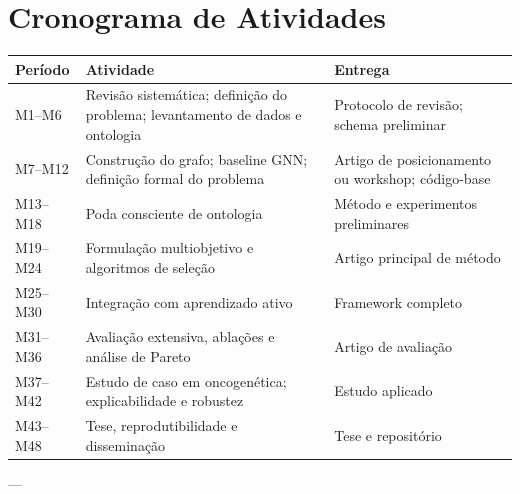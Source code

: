 \section{Cronograma de Atividades}\label{sec:cronograma-atividades}

\begin{table}[h!]
\centering
\renewcommand{\arraystretch}{1.4}
\begin{tabularx}{\textwidth}{@{} l X X @{}}
\toprule
\textbf{Período} & \textbf{Atividade} & \textbf{Entrega} \\
\midrule
M1–M6   & Revisão sistemática; definição do problema; levantamento de dados e ontologia & Protocolo de revisão; schema preliminar \\
M7–M12  & Construção do grafo; baseline GNN; definição formal do problema & Artigo de posicionamento ou workshop; código-base \\
M13–M18 & Poda consciente de ontologia & Método e experimentos preliminares \\
M19–M24 & Formulação multiobjetivo e algoritmos de seleção & Artigo principal de método \\
M25–M30 & Integração com aprendizado ativo & Framework completo \\
M31–M36 & Avaliação extensiva, ablações e análise de Pareto & Artigo de avaliação \\
M37–M42 & Estudo de caso em oncogenética; explicabilidade e robustez & Estudo aplicado \\
M43–M48 & Tese, reprodutibilidade e disseminação & Tese e repositório \\
\bottomrule
\end{tabularx}
\end{table}

---